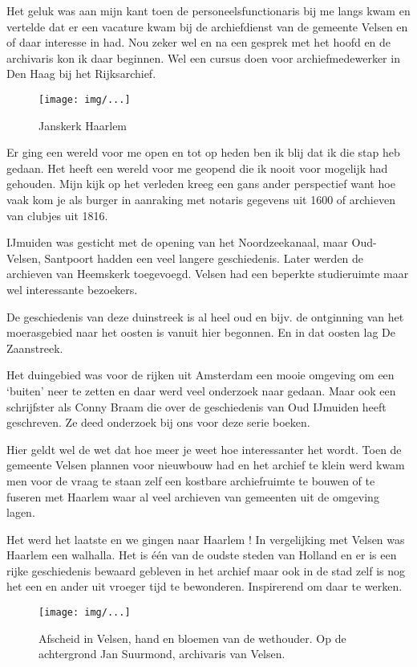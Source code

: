 \documentclass[10pt,twoside,openright]{memoir}
\begin{document}
Het geluk was aan mijn kant toen de personeelsfunctionaris bij me langs kwam en vertelde dat er een vacature kwam bij de archiefdienst van de gemeente Velsen en of daar interesse in had. Nou zeker wel en na een gesprek met het hoofd en de archivaris kon ik daar beginnen. Wel een cursus doen voor archiefmedewerker in Den Haag bij het Rijksarchief. 

\begin{figure}[t]
\texttt{[image: img/...]}
\caption{Janskerk Haarlem}
\end{figure}

Er ging een wereld voor me open en tot op heden ben ik blij dat ik die stap heb gedaan. Het heeft een wereld voor me geopend die ik nooit voor mogelijk had gehouden. Mijn kijk op het verleden kreeg een gans ander perspectief want hoe vaak kom je als burger in aanraking met notaris gegevens uit 1600 of archieven van clubjes uit 1816. 

IJmuiden was gesticht met de opening van het Noordzeekanaal, maar Oud-Velsen, Santpoort hadden een veel langere geschiedenis. Later werden de archieven van Heemskerk toegevoegd. Velsen had een beperkte studieruimte maar wel interessante bezoekers. 

De geschiedenis van deze duinstreek is al heel oud en bijv. de ontginning van het moerasgebied naar het oosten is vanuit hier begonnen. En in dat oosten lag De Zaanstreek. 

Het duingebied was voor de rijken uit Amsterdam een mooie omgeving om een ‘buiten’ neer te zetten en daar werd veel onderzoek naar gedaan. Maar ook een schrijfster als Conny Braam die over de geschiedenis van Oud IJmuiden heeft geschreven. Ze deed onderzoek bij ons voor deze serie boeken.

Hier geldt wel de wet dat hoe meer je weet hoe interessanter het wordt. Toen de gemeente Velsen plannen voor nieuwbouw had en het archief te klein werd kwam men voor de vraag te staan zelf een kostbare archiefruimte te bouwen of te fuseren met Haarlem waar al veel archieven van gemeenten uit de omgeving lagen. 

Het werd het laatste en we gingen naar Haarlem ! In vergelijking met Velsen was Haarlem een walhalla. Het is één van de oudste steden van Holland en er is een rijke geschiedenis bewaard gebleven in het archief maar ook in de stad zelf is nog het een en ander uit vroeger tijd te bewonderen. Inspirerend om daar te werken. 

\begin{figure}[t]
\texttt{[image: img/...]}
\caption{Afscheid in Velsen, hand en bloemen van de wethouder. Op de achtergrond Jan Suurmond, archivaris van Velsen.}
\end{figure}
\end{document}
